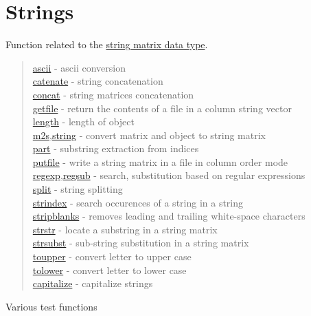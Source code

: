 \chapter*{Strings}

Function related to the \hyperlink{Smat}{string matrix data type}.


\begin{quote}
\noindent
\hyperlink{ascii}{ascii} - ascii conversion  \\
\hyperlink{catenate}{catenate} - string concatenation  \\
\hyperlink{concat}{concat} - string matrices concatenation  \\
\hyperlink{getfile}{getfile} - return the contents of a file in a column string vector  \\
\hyperlink{length}{length} - length of object  \\
\hyperlink{m2s}{m2s},\hyperlink{string}{string} - convert matrix and object to string matrix  \\
\hyperlink{part}{part} - substring extraction from indices\\
\hyperlink{putfile}{putfile} - write a string matrix in a file in column order mode \\
\hyperlink{regexp}{regexp},\hyperlink{regsub}{regsub} - search,
substitution based on regular expressions\\
\hyperlink{split}{split} - string splitting\\
\hyperlink{strindex}{strindex} - search occurences of a string in a string\\
\hyperlink{stripblanks}{stripblanks} - removes leading and trailing white-space characters\\
\hyperlink{strstr}{strstr} - locate a substring in a string matrix\\
\hyperlink{strsubst}{strsubst} - sub-string substitution in a string matrix\\
\hyperlink{toupper}{toupper} - convert letter to upper case\\
\hyperlink{tolower}{tolower} - convert letter to lower case\\
\hyperlink{capitalize}{capitalize} - capitalize strings\\
\end{quote}

Various test functions

